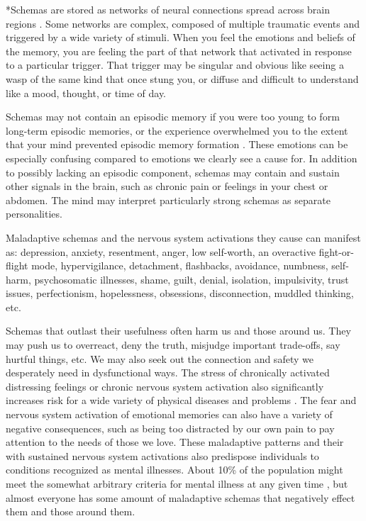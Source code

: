 \documentclass[12pt,letterpaper]{article}
\begin{document}
*Schemas are stored as networks of neural connections spread across brain regions \cite{eckerUnlocking}. Some networks are complex, composed of multiple traumatic events and triggered by a wide variety of stimuli. When you feel the emotions and beliefs of the memory, you are feeling the part of that network that activated in response to a particular trigger. That trigger may be singular and obvious like seeing a wasp of the same kind that once stung you, or diffuse and difficult to understand like a mood, thought, or time of day. 

Schemas may not contain an episodic memory if you were too young to form long-term episodic memories, or the experience overwhelmed you to the extent that your mind prevented episodic memory formation \cite{vanderKolkBody,brownAttachmentDisturbances}. These emotions can be especially confusing compared to emotions we clearly see a cause for. In addition to possibly lacking an episodic component, schemas may contain and sustain other signals in the brain, such as chronic pain or feelings in your chest or abdomen. The mind may interpret particularly strong schemas as separate personalities.

Maladaptive schemas and the nervous system activations they cause can manifest as: depression, anxiety, resentment, anger, low self-worth, an overactive fight-or-flight mode, hypervigilance, detachment, flashbacks, avoidance, numbness, self-harm, psychosomatic illnesses, shame, guilt, denial, isolation, impulsivity, trust issues, perfectionism, hopelessness, obsessions, disconnection, muddled thinking, etc. 

Schemas that outlast their usefulness often harm us and those around us. They may push us to overreact, deny the truth, misjudge important trade-offs, say hurtful things, etc. We may also seek out the connection and safety we desperately need in dysfunctional ways. The stress of chronically activated distressing feelings or chronic nervous system activation also significantly increases risk for a wide variety of physical diseases and problems \cite{felittiACE}.  The fear and nervous system activation of emotional memories can also have a variety of negative consequences, such as being too distracted by our own pain to pay attention to the needs of those we love. These maladaptive patterns and their with sustained nervous system activations also predispose individuals to conditions recognized as mental illnesses. About 10\% of the population might meet the somewhat arbitrary criteria for mental illness at any given time \cite{whoMentalHealth}, but almost everyone has some amount of maladaptive schemas that negatively effect them and those around them.
\end{document}
